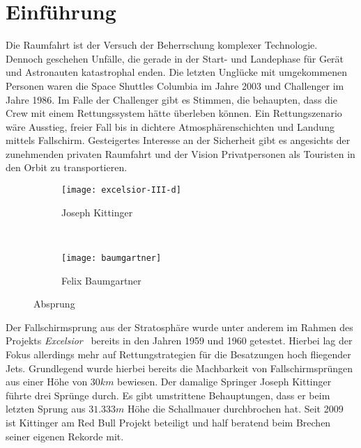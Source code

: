 \newpage

\section{Einführung}

Die Raumfahrt ist der Versuch der Beherrschung komplexer Technologie.
Dennoch geschehen Unfälle, die gerade in der Start- und Landephase für Gerät und Astronauten katastrophal enden.
Die letzten Unglücke mit umgekommenen Personen waren die Space Shuttles Columbia im Jahre 2003 und Challenger im Jahre 1986.
Im Falle der Challenger gibt es Stimmen, die behaupten, dass die Crew mit einem Rettungssystem hätte überleben können.
Ein Rettungszenario wäre Ausstieg, freier Fall bis in dichtere Atmosphärenschichten und Landung mittels Fallschirm.
Gesteigertes Interesse an der Sicherheit gibt es angesichts der zunehmenden privaten Raumfahrt und der Vision Privatpersonen als Touristen in den Orbit zu transportieren.

\begin{figure}[h]
  \centering
  \begin{subfigure}[b]{0.25\textwidth}
    \centering
    \texttt{[image: excelsior-III-d]}
    \caption{Joseph Kittinger\protect\footnotemark}
    \label{fig:excelsior-III-d}
  \end{subfigure}
  ~
  \begin{subfigure}[b]{0.25\textwidth}
    \centering
    \texttt{[image: baumgartner]}
    \caption{Felix Baumgartner\protect\footnotemark}
    \label{fig:baumgartner}
  \end{subfigure}
  \caption{Absprung}
\end{figure}

Der Fallschirmsprung aus der Stratosphäre wurde unter anderem im Rahmen des Projekts \emph{Excelsior}~\cite{af.mil:excelsior} bereits in den Jahren 1959 und 1960 getestet.
Hierbei lag der Fokus allerdings mehr auf Rettungstrategien für die Besatzungen hoch fliegender Jets.
Grundlegend wurde hierbei bereits die Machbarkeit von Fallschirmsprüngen aus einer Höhe von $30km$ bewiesen.
Der damalige Springer Joseph Kittinger führte drei Sprünge durch.
Es gibt umstrittene Behauptungen, dass er beim letzten Sprung aus $31.333m$ Höhe die Schallmauer durchbrochen hat.
Seit 2009 ist Kittinger am Red Bull Projekt beteiligt und half beratend beim Brechen seiner eigenen Rekorde mit.

